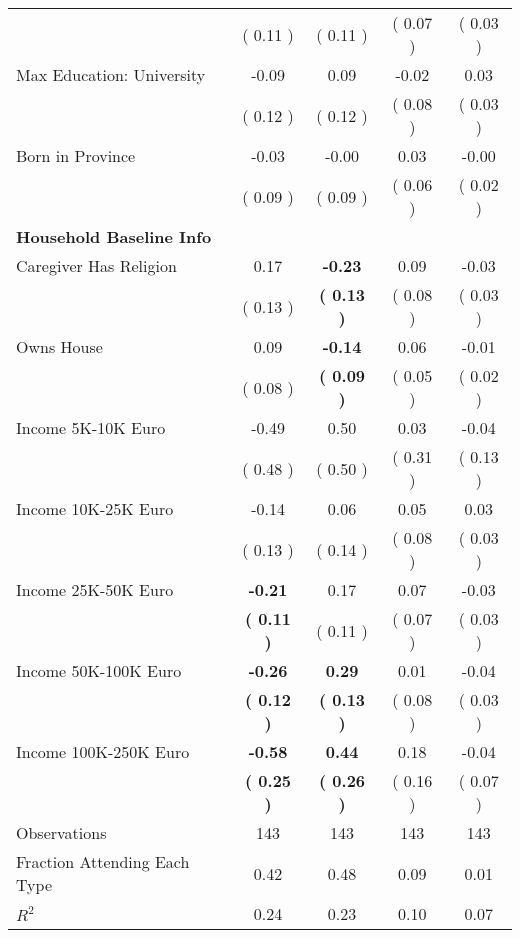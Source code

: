 \begin{table}[H]
{\begin{tabular}{lcccc}
\quad  & (     0.11 ) & (     0.11 )  & (     0.07 )  & (     0.03 )  \\
\quad Max Education: University &     -0.09 &      0.09 &     -0.02 &      0.03 \\
\quad  & (     0.12 ) & (     0.12 )  & (     0.08 )  & (     0.03 )  \\
\quad Born in Province &     -0.03 &     -0.00 &      0.03 &     -0.00 \\
\quad  & (     0.09 ) & (     0.09 )  & (     0.06 )  & (     0.02 )  \\
\midrule
\textbf{Household Baseline Info} \\
\quad Caregiver Has Religion &      0.17 & \textbf{    -0.23} &      0.09 &     -0.03 \\
\quad  & (     0.13 ) & \textbf{(     0.13 )}  & (     0.08 )  & (     0.03 )  \\
\quad Owns House &      0.09 & \textbf{    -0.14} &      0.06 &     -0.01 \\
\quad  & (     0.08 ) & \textbf{(     0.09 )}  & (     0.05 )  & (     0.02 )  \\
\quad Income 5K-10K Euro &     -0.49 &      0.50 &      0.03 &     -0.04 \\
\quad  & (     0.48 ) & (     0.50 )  & (     0.31 )  & (     0.13 )  \\
\quad Income 10K-25K Euro &     -0.14 &      0.06 &      0.05 &      0.03 \\
\quad  & (     0.13 ) & (     0.14 )  & (     0.08 )  & (     0.03 )  \\
\quad Income 25K-50K Euro & \textbf{    -0.21} &      0.17 &      0.07 &     -0.03 \\
\quad  & \textbf{(     0.11 )} & (     0.11 )  & (     0.07 )  & (     0.03 )  \\
\quad Income 50K-100K Euro & \textbf{    -0.26} & \textbf{     0.29} &      0.01 &     -0.04 \\
\quad  & \textbf{(     0.12 )} & \textbf{(     0.13 )}  & (     0.08 )  & (     0.03 )  \\
\quad Income 100K-250K Euro & \textbf{    -0.58} & \textbf{     0.44} &      0.18 &     -0.04 \\
\quad  & \textbf{(     0.25 )} & \textbf{(     0.26 )}  & (     0.16 )  & (     0.07 )  \\
\midrule
Observations & 143 & 143 & 143 & 143 \\
Fraction Attending Each Type &      0.42 &      0.48 &      0.09 &      0.01 \\
\midrule
$ R^2$ &      0.24 &      0.23 &      0.10 &      0.07 \\
\bottomrule
\end{tabular}}
\end{table}
